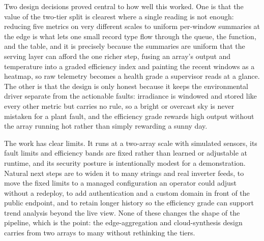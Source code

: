 \documentclass[conference]{IEEEtran}
\begin{document}
Two design decisions proved central to how well this worked. One is that the value of the two-tier split is clearest where a single reading is not enough: reducing five metrics on very different scales to uniform per-window summaries at the edge is what lets one small record type flow through the queue, the function, and the table, and it is precisely because the summaries are uniform that the serving layer can afford the one richer step, fusing an array's output and temperature into a graded efficiency index and painting the recent windows as a heatmap, so raw telemetry becomes a health grade a supervisor reads at a glance. The other is that the design is only honest because it keeps the environmental driver separate from the actionable faults: irradiance is windowed and stored like every other metric but carries no rule, so a bright or overcast sky is never mistaken for a plant fault, and the efficiency grade rewards high output without the array running hot rather than simply rewarding a sunny day.

The work has clear limits. It runs at a two-array scale with simulated sensors, its fault limits and efficiency bands are fixed rather than learned or adjustable at runtime, and its security posture is intentionally modest for a demonstration. Natural next steps are to widen it to many strings and real inverter feeds, to move the fixed limits to a managed configuration an operator could adjust without a redeploy, to add authentication and a custom domain in front of the public endpoint, and to retain longer history so the efficiency grade can support trend analysis beyond the live view. None of these changes the shape of the pipeline, which is the point: the edge-aggregation and cloud-synthesis design carries from two arrays to many without rethinking the tiers.
\end{document}
